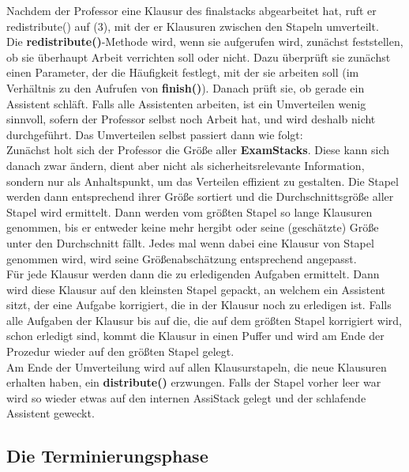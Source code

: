 \documentclass[12pt,a4paper]{article}
\begin{document}
Nachdem der Professor eine Klausur des finalstacks abgearbeitet hat, ruft er redistribute() auf (3), mit der er Klausuren zwischen den Stapeln umverteilt. \\
Die \textbf{redistribute()}-Methode wird, wenn sie aufgerufen wird, zunächst feststellen, ob sie überhaupt Arbeit verrichten soll oder nicht. Dazu überprüft sie zunächst einen Parameter, der die Häufigkeit festlegt, mit der sie arbeiten soll (im Verhältnis zu den Aufrufen von \textbf{finish()}). Danach prüft sie, ob gerade ein Assistent schläft. Falls alle Assistenten arbeiten, ist ein Umverteilen wenig sinnvoll, sofern der Professor selbst noch Arbeit hat, und wird deshalb nicht durchgeführt.
Das Umverteilen selbst passiert dann wie folgt:\\
Zunächst holt sich der Professor die Größe aller \textbf{ExamStacks}. Diese kann sich danach zwar ändern, dient aber nicht als sicherheitsrelevante Information, sondern nur als Anhaltspunkt, um das Verteilen effizient zu gestalten. Die Stapel werden dann entsprechend ihrer Größe sortiert und die Durchschnittsgröße aller Stapel wird ermittelt. Dann werden vom größten Stapel so lange Klausuren genommen, bis er entweder keine mehr hergibt oder seine (geschätzte) Größe unter den Durchschnitt fällt. Jedes mal wenn dabei eine Klausur von Stapel genommen wird, wird seine Größenabschätzung entsprechend angepasst.\\
Für jede Klausur werden dann die zu erledigenden Aufgaben ermittelt. Dann wird diese Klausur auf den kleinsten Stapel gepackt, an welchem ein Assistent sitzt, der eine Aufgabe korrigiert, die in der Klausur noch zu erledigen ist. Falls alle Aufgaben der Klausur bis auf die, die auf dem größten Stapel korrigiert wird, schon erledigt sind, kommt die Klausur in einen Puffer und wird am Ende der Prozedur wieder auf den größten Stapel gelegt.\\
Am Ende der Umverteilung wird auf allen Klausurstapeln, die neue Klausuren erhalten haben, ein \textbf{distribute()} erzwungen. Falls der Stapel vorher leer war wird so wieder etwas auf den internen AssiStack gelegt und der schlafende Assistent geweckt.

\subsection{Die Terminierungsphase}
\end{document}

